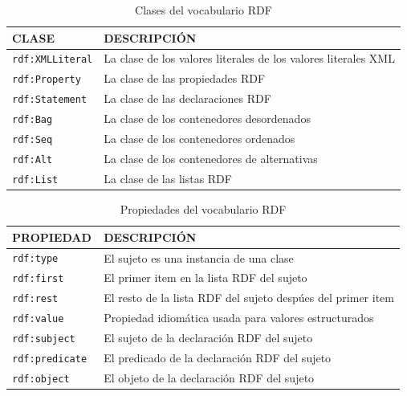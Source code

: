 \begin{table}[H]
	\caption{Clases del vocabulario RDF}
	\label{tabla-rdf1}
		\centering
	\begin{tabular}{|
			>{\columncolor[HTML]{FFFFFF}}l |m{9cm}|}
		\hline
		\cellcolor[HTML]{EFEFEF}\textbf{CLASE} & \cellcolor[HTML]{EFEFEF} \textbf{DESCRIPCIÓN}\\ \hline
		\texttt{rdf:XMLLiteral}                         & La clase de los valores literales de los valores literales XML                         \\ \hline
		\texttt{rdf:Property}                         &  La clase de las propiedades RDF
		\\ \hline
		\texttt{rdf:Statement}                         &    La clase de las declaraciones RDF
		\\ \hline
		\texttt{rdf:Bag}                         &    La clase de los contenedores desordenados
		\\ \hline
		\texttt{rdf:Seq}                         &    La clase de los contenedores ordenados                      \\ \hline
		\texttt{rdf:Alt}                         &     La clase de los contenedores de alternativas                     \\ \hline
		\texttt{rdf:List}                         &  La clase de las listas RDF                        \\ \hline
	\end{tabular}
	
\end{table}

\begin{table}[H]
	\caption{Propiedades del vocabulario RDF}
	\label{tabla-rdf2}
		\centering
	\begin{tabular}{|
			>{\columncolor[HTML]{FFFFFF}}l |m{9cm}|}
		\hline
		\cellcolor[HTML]{EFEFEF}\textbf{PROPIEDAD} & \cellcolor[HTML]{EFEFEF} \textbf{DESCRIPCIÓN}\\ \hline
		\texttt{rdf:type}                         &      El sujeto es una instancia de una clase                    \\ \hline
		\texttt{rdf:first}                         &   El primer item en la lista RDF del sujeto                       \\ \hline
		\texttt{rdf:rest}                         &        El resto de la lista RDF del sujeto despúes del primer item                  \\ \hline
		\texttt{rdf:value}                         &    Propiedad idiomática usada para valores estructurados                       \\ \hline
		\texttt{rdf:subject}                         &     El sujeto de la declaración RDF del sujeto                     \\ \hline
		\texttt{rdf:predicate }                         &      El predicado de la declaración RDF del sujeto                    \\ \hline
		\texttt{rdf:object}                         &        El objeto de la declaración RDF del sujeto                  \\ \hline
	\end{tabular}
\end{table}

